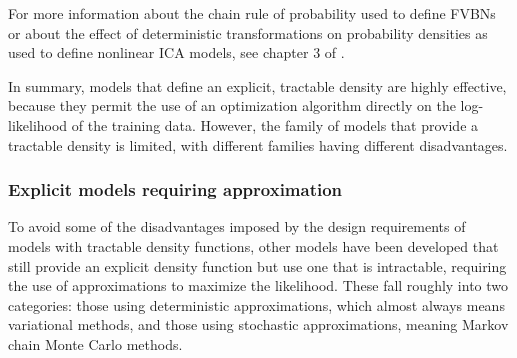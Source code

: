 For more information about the chain rule of probability used to define FVBNs
or about the effect of deterministic transformations on probability densities
as used to define nonlinear ICA models, see chapter 3 of \citet{Goodfellow-et-al-2016}.

In summary, models that define an explicit, tractable density are highly
effective, because they permit the use of an optimization algorithm directly
on the log-likelihood of the training data.
However, the family of models that provide a tractable density is limited,
with different families having different disadvantages.

\subsubsection{Explicit models requiring approximation}
\label{sec:approx}

To avoid some of the disadvantages imposed by the design requirements of models
with tractable density functions, other models have been developed that still
provide an explicit density function but use one that is intractable, requiring
the use of approximations to maximize the likelihood.
These fall roughly into two categories: those using deterministic approximations,
which almost always means variational methods, and those using stochastic approximations,
meaning Markov chain Monte Carlo methods.

